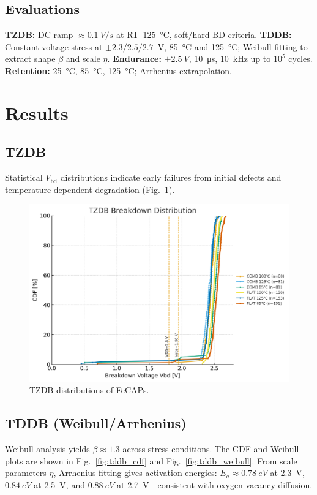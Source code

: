 \documentclass[conference]{IEEEtran}
\begin{document}
\subsection{Evaluations}
\textbf{TZDB:} DC-ramp \(\approx\SI{0.1}{V/s}\) at RT–\SI{125}{\celsius}, soft/hard BD criteria.  
\textbf{TDDB:} Constant-voltage stress at \(\pm 2.3/2.5/2.7\)~V, \SI{85}{\celsius} and \SI{125}{\celsius}; Weibull fitting to extract shape \(\beta\) and scale \(\eta\).  
\textbf{Endurance:} \(\pm\SI{2.5}{V}\), \SI{10}{\micro s}, \SI{10}{kHz} up to \(10^{5}\) cycles.  
\textbf{Retention:} \SI{25}{\celsius}, \SI{85}{\celsius}, \SI{125}{\celsius}; Arrhenius extrapolation.

\section{Results}

\subsection{TZDB}
Statistical \(V_{\mathrm{bd}}\) distributions indicate early failures from initial defects and temperature-dependent degradation (Fig.~\ref{fig:tzdb}).

\begin{figure}[t]
  \centering
  \includegraphics[width=\linewidth]{figures/fig3_tzdb.png}
  \caption{TZDB distributions of FeCAPs.}
  \label{fig:tzdb}
\end{figure}

\subsection{TDDB (Weibull/Arrhenius)}
Weibull analysis yields \(\beta \approx 1.3\) across stress conditions.  
The CDF and Weibull plots are shown in Fig.~\ref{fig:tddb_cdf} and Fig.~\ref{fig:tddb_weibull}.  
From scale parameters \(\eta\), Arrhenius fitting gives activation energies:
\(E_a\approx\SI{0.78}{eV}\) at 2.3~V, \(\SI{0.84}{eV}\) at 2.5~V, and \(\SI{0.88}{eV}\) at 2.7~V—consistent with oxygen-vacancy diffusion.
\end{document}
